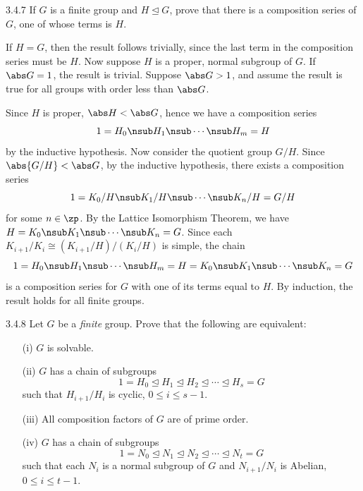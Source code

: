 \begin{exercise}{3.4.7}
    If $G$ is a finite group and $H \trianglelefteq G$, prove that there is a composition series of $G$, one of whose terms is $H$.
\end{exercise}

\begin{sol}
    If $H = G$, then the result follows trivially, since the last term in the composition series must be $H$.
	Now suppose $H$ is a proper, normal subgroup of $G$.
	If $\abs G = 1$, the result is trivial.
	Suppose $\abs G > 1$, and assume the result is true for all groups with order less than $\abs G$.

    Since $H$ is proper, $\abs H < \abs G$, hence we have a composition series
    \[
    	1 = H_0 \nsub H_1 \nsub \cdots \nsub H_m = H
    \]
    by the inductive hypothesis.
	Now consider the quotient group $G/H$.
	Since $\abs{G/H} < \abs G$, by the inductive hypothesis, there exists a composition series
    \[
    	1 = K_0/H \nsub K_1/H \nsub \cdots \nsub K_n/H = G/H
    \]
    for some $n \in \zp$.
	By the Lattice Isomorphism Theorem, we have $H = K_0 \nsub K_1 \nsub \cdots \nsub K_n = G$.
	Since each $K_{i + 1}/K_i \cong (K_{i + 1}/H)/(K_i/H)$ is simple, the chain
    \[
    	1 = H_0 \nsub H_1 \nsub \cdots \nsub H_m = H = K_0 \nsub K_1 \nsub \cdots \nsub K_n = G
    \]
    is a composition series for $G$ with one of its terms equal to $H$.
	By induction, the result holds for all finite groups.
\end{sol}

\begin{exercise}{3.4.8}
    Let $G$ be a \emph{finite} group.
	Prove that the following are equivalent:
    \begin{enumerate}
        \item[(i)] $G$ is solvable.
        \item[(ii)] $G$ has a chain of subgroups
        \[
        	1 = H_0 \trianglelefteq H_1 \trianglelefteq H_2 \trianglelefteq \cdots \trianglelefteq H_s = G
        \]
        such that $H_{i+1}/H_i$ is cyclic, $0 \le i \le s-1$.
        \item[(iii)] All composition factors of $G$ are of prime order.
        \item[(iv)] $G$ has a chain of subgroups
        \[
        	1 = N_0 \trianglelefteq N_1 \trianglelefteq N_2 \trianglelefteq \cdots \trianglelefteq N_t = G
        \]
        such that each $N_i$ is a normal subgroup of $G$ and $N_{i+1}/N_i$ is Abelian, $0 \le i \le t-1$.
    \end{enumerate}
    \noindent [For (iv), prove that a minimal non-trivial normal subgroup $M$ of $G$ is necessarily Abelian and then use induction.
	To see that $M$ is Abelian, let $N \trianglelefteq M$ be of prime index (by (iii)) and show that $x^{-1}y^{-1}xy \in N$ for all $x,y \in M$ (cf. \exref{3.1.40}).
	Apply the same argument to $gNg^{-1}$ to show that $x^{-1}y^{-1}xy$ lies in the intersection of all $G$-conjugates of $N$, and use the minimality of $M$ to conclude that $x^{-1}y^{-1}xy = 1$.]
\end{exercise}

